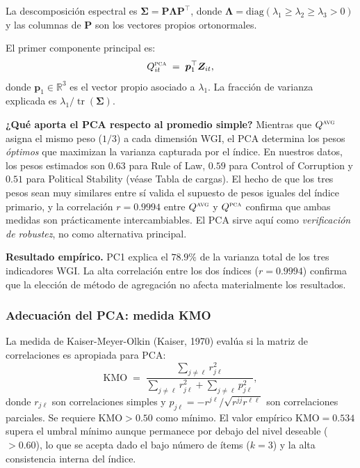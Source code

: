 \documentclass[12pt, a4paper]{article}
\theoremstyle{definition}
\DeclareMathOperator{\tr}{tr}
\newcommand{\R}{\mathbb{R}}
\begin{document}
La descomposición espectral es $\bm{\Sigma} = \bm{P}\bm{\Lambda}\bm{P}^\top$, donde $\bm{\Lambda} = \mathrm{diag}(\lambda_1 \geq \lambda_2 \geq \lambda_3 > 0)$ y las columnas de $\bm{P}$ son los vectores propios ortonormales.

El primer componente principal es:
\[
  Q^{\textsc{pca}}_{it} \;=\; \bm{p}_1^\top \bm{Z}_{it},
\]
donde $\bm{p}_1 \in \R^3$ es el vector propio asociado a $\lambda_1$. La fracción de varianza explicada es $\lambda_1 / \tr(\bm{\Sigma})$.

\begin{intuitionbox}
\textbf{¿Qué aporta el PCA respecto al promedio simple?} Mientras que $Q^{\textsc{avg}}$ asigna el mismo peso ($1/3$) a cada dimensión WGI, el PCA determina los pesos \emph{óptimos} que maximizan la varianza capturada por el índice. En nuestros datos, los pesos estimados son $0.63$ para Rule of Law, $0.59$ para Control of Corruption y $0.51$ para Political Stability (véase Tabla de cargas). El hecho de que los tres pesos sean muy similares entre sí valida el supuesto de pesos iguales del índice primario, y la correlación $r = 0.9994$ entre $Q^{\textsc{avg}}$ y $Q^{\textsc{pca}}$ confirma que ambas medidas son prácticamente intercambiables. El PCA sirve aquí como \emph{verificación de robustez}, no como alternativa principal.
\end{intuitionbox}

\begin{resultbox}
\textbf{Resultado empírico.} PC1 explica el $78.9\%$ de la varianza total de los tres indicadores WGI. La alta correlación entre los dos índices ($r = 0.9994$) confirma que la elección de método de agregación no afecta materialmente los resultados.
\end{resultbox}

\subsubsection{Adecuación del PCA: medida KMO}

La medida de Kaiser-Meyer-Olkin (Kaiser, 1970) evalúa si la matriz de correlaciones es apropiada para PCA:
\[
  \mathrm{KMO} \;=\; \frac{\sum_{j \neq \ell} r_{j\ell}^2}{\sum_{j \neq \ell} r_{j\ell}^2 + \sum_{j \neq \ell} p_{j\ell}^2},
\]
donde $r_{j\ell}$ son correlaciones simples y $p_{j\ell} = -r^{j\ell}/\sqrt{r^{jj}r^{\ell\ell}}$ son correlaciones parciales. Se requiere $\mathrm{KMO} > 0.50$ como mínimo. El valor empírico $\mathrm{KMO} = 0.534$ supera el umbral mínimo aunque permanece por debajo del nivel deseable ($> 0.60$), lo que se acepta dado el bajo número de ítems ($k = 3$) y la alta consistencia interna del índice.
\end{document}
